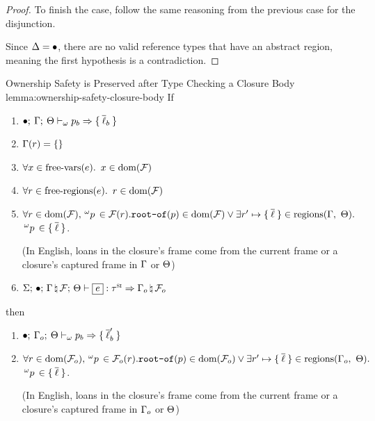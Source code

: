 \begin{proof}
  To finish the case, follow the same reasoning from the previous case for the
  disjunction.


  \vspace{1em}
  \noindent \framebox[\textwidth]{ \figuresize
    \begin{mathpar}
      \ODerefAbs
    \end{mathpar}
  } \vspace{1em}

  Since $\Delta = \bullet$, there are no valid reference types that have
  an abstract region, meaning the first hypothesis is a contradiction.

\end{proof}

\begin{oxlemma}{Ownership Safety is Preserved after Type Checking a Closure Body}
  {lemma:ownership-safety-closure-body} If
  \begin{enumerate}
  \item $\bullet; \: \Gamma; \: \Theta \vdash_{\omega} p_b \Rightarrow \{ \: \overline{\ell}_b \: \}$
  \item $\Gamma(r) = \{\}$ 
  \item $\forall x \in \textrm{free-vars}(e).$ $x \in \textrm{dom}(\mathcal{F})$ 
  \item $\forall r \in \textrm{free-regions}(e).$ $r \in \textrm{dom}(\mathcal{F})$
  \item $\forall r \in \textrm{dom}(\mathcal{F}),
    \,^{\omega}p\, \in \mathcal{F}(r).
    \texttt{root-of}(p) \in \textrm{dom}(\mathcal{F}) \vee
    \exists r^\prime \mapsto \{ \: \overline{\ell} \: \} \in
    \textrm{regions}(\Gamma,\ \Theta).$ $\,^{\omega}p\, \in \{ \: \overline{\ell} \: \}$.
    
    (In English, loans in the closure's frame come from the current frame or a closure's captured
    frame in $\Gamma$ or $\Theta$)
  \item $\oxtypjudge{\oxglobalctx}{\oxemptyctx}{\oxkontctx}{\oxnewframe{\oxvarctx}{\oxframe}}
    {\oxexpr}{\oxsitype}{\oxnewframe{\oxvarctx_o}{\oxframe_o}}$
  \end{enumerate}
  then
  \begin{enumerate}
  \item $\bullet; \: \Gamma_o; \: \Theta \vdash_{\omega} p_b \Rightarrow \{ \: \overline{\ell}_b^\prime \: \}$
  \item $\forall r \in \textrm{dom}(\mathcal{F}_o),
    \,^{\omega}p\, \in \mathcal{F}_o(r). \texttt{root-of}(p) \in \textrm{dom}(\mathcal{F}_o) \vee \exists r^\prime \mapsto \{ \: \overline{\ell} \: \} \in
    \textrm{regions}(\Gamma_o,\ \Theta).$ $\,^{\omega}p\, \in \{ \: \overline{\ell} \: \}$.
    
    (In English, loans in the closure's frame come from the current frame or a closure's captured
    frame in $\Gamma_o$ or $\Theta$)
  \end{enumerate}
\end{oxlemma}

